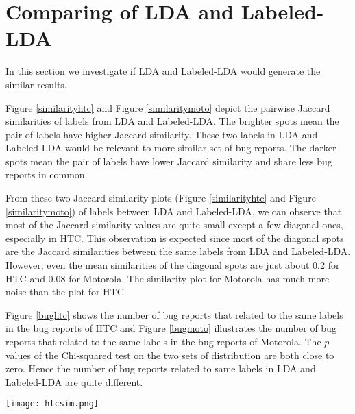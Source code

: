 \documentclass[10pt, conference, compsocconf]{IEEEtran}
\begin{document}



\section{Comparing of LDA and Labeled-LDA}
\label{sec:comparinglda}

In this section we investigate if LDA and Labeled-LDA would generate the similar results.

Figure \ref{similarityhtc} and Figure \ref{similaritymoto} depict the pairwise Jaccard similarities of labels from LDA and Labeled-LDA. The brighter spots mean the pair of labels have higher Jaccard similarity. These two labels in LDA and Labeled-LDA would be relevant to more similar set of bug reports. The darker spots mean the pair of labels have lower Jaccard similarity and share less bug reports in common. 

From these two Jaccard similarity plots (Figure \ref{similarityhtc} and Figure \ref{similaritymoto}) of labels between LDA and Labeled-LDA, we can observe that most of the Jaccard similarity values are quite small except a few diagonal ones, especially in HTC. This observation is expected since most of the diagonal spots are the Jaccard similarities between the same labels from LDA and Labeled-LDA. However, even the mean similarities of the diagonal spots are just about 0.2 for HTC and 0.08 for Motorola. The similarity plot for Motorola has much more noise than the plot for HTC.  

Figure \ref{bughtc} shows the number of bug reports that related to the same labels in the bug reports of HTC and Figure \ref{bugmoto} illustrates the number of bug reports that related to the same labels in the bug reports of Motorola. The $ p $ values of the Chi-squared test on the two sets of distribution are both close to zero. Hence the number of bug reports related to same labels in LDA and Labeled-LDA are quite different.

\begin{figure*}[htb]
\centering
\texttt{[image: htcsim.png]}
\caption{Jaccard similarity of labels between LDA and Labeled-LDA in HTC. X axis is the labels in Labeled-LDA and Y axis is the labels of topics generated by LDA. The label ``null" in the Y axis means that topic cannot be labeled. The result is based on the HTC bug reports under the threshold of document relevance of 0.2. Brighter means higher Jaccard similarity.}
\label{similarityhtc}
\end{figure*}
\end{document}
